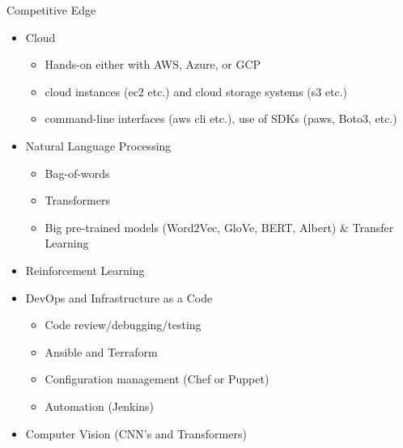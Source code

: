 \documentclass[compress,brown]{beamer}
\begin{document}
\begin{frame} {Competitive Edge}
	\begin{itemize}
		\item Cloud
			\begin{itemize}
				\item Hands-on either with AWS, Azure, or GCP
				\item cloud instances (ec2 etc.) and cloud storage systems (s3 etc.)
				\item command-line interfaces (aws cli etc.), use of SDKs (paws, Boto3, etc.)
			\end{itemize}		
		\item Natural Language Processing
			\begin{itemize}
				\item Bag-of-words
				\item Transformers
				\item Big pre-trained models (Word2Vec, GloVe, BERT, Albert) \& Transfer Learning
			\end{itemize}		
		\item Reinforcement Learning
		\item DevOps and Infrastructure as a Code
		\begin{itemize}
			\item Code review/debugging/testing
			\item Ansible and Terraform 
			\item Configuration management (Chef or Puppet)
			\item Automation (Jenkins)
		\end{itemize}
		\item Computer Vision (CNN's and Transformers)
	\end{itemize}
\end{frame}
\end{document}
